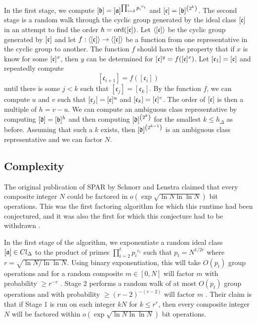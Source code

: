 \documentclass{ucalgthes1}
\theoremstyle{definition}
\DeclareMathOperator{\ord}{ord}
\begin{document}
In the first stage, we compute $[\mathfrak b] = [\mathfrak a]^{\prod_{i=2}^t {p_i}^{e_i}}$ and $[\mathfrak c] = [\mathfrak b]^{\left(2^k\right)}$.  The second stage is a random walk through the cyclic group generated by the ideal class $[\mathfrak c]$ in an attempt to find the order $h = \ord(\cclass)$.  Let $\langle [\mathfrak c] \rangle$ be the cyclic group generated by $[\mathfrak c]$ and let $f : \langle [\mathfrak c] \rangle \rightarrow \langle [\mathfrak c] \rangle$ be a function from one representative in the cyclic group to another.  The function $f$ should have the property that if $x$ is know for some $[\mathfrak c] ^x$, then $y$ can be determined for $[\mathfrak c]^y = f([\mathfrak c]^x)$.  Let $[\mathfrak c_1] = [\mathfrak c]$ and repeatedly compute
\[
	[\mathfrak c_{i+1}] = f([\mathfrak c_i])
\]
until there is some $j < k$ such that $[\mathfrak c_j] = [\mathfrak c_k]$.  By the function $f$, we can compute $u$ and $v$ such that $[\mathfrak c_j]=[\mathfrak c]^u$ and $[\mathfrak c_k]=[\mathfrak c]^v$.  The order of $[\mathfrak c]$ is then a multiple of $h = v - u$.  We can compute an ambiguous class representative by computing $[\mathfrak d] = [\mathfrak b]^h$ and then computing $[\mathfrak d]^{\left(2^k\right)}$ for the smallest $k \le h_\Delta$ as before.  Assuming that such a $k$ exists, then $[\mathfrak d]^{\left(2^{k-1}\right)}$ is an ambiguous class representative and we can factor $N$.

\subsection{Complexity}

The original publication of SPAR by Schnorr and Lenstra \cite{Schnorr1984} claimed that every composite integer $N$ could be factored in $o\left(\exp\sqrt{\ln N \ln\ln N}\right)$ bit operations.  This was the first factoring algorithm for which this runtime had been conjectured, and it was also the first for which this conjecture had to be withdrawn \cite{Lenstra1992}.

In the first stage of the algorithm, we exponentiate a random ideal class $[\mathfrak a] \in Cl_\Delta$ to the product of primes $\prod_{i=2}^t {p_i}^{e_i}$ such that $p_t = N^{1/2r}$ where $r = \sqrt{\ln N / \ln \ln N}$.  Using binary exponentiation, this will take $O(p_t)$ group operations and for a random composite $m \in [0, N]$ will factor $m$ with probability $\ge r^{-r}$ \cite[p.290]{Schnorr1984}. Stage 2 performs a random walk of at most $O(p_t)$ group operations and with probability $\ge (r-2)^{-(r-2)}$ will factor $m$ \cite[p.290]{Schnorr1984}.  Their claim is that if Stage 1 is run on each integer $kN$ for $k \le r^r$, then every composite integer $N$ will be factored within $o\left(\exp \sqrt{ \ln N \ln\ln N } \right)$ bit operations.
\end{document}
